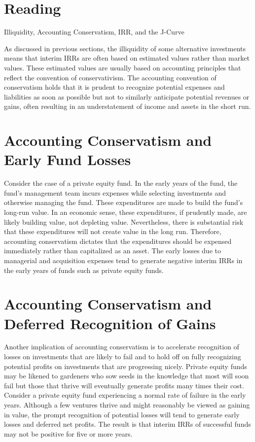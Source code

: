 \documentclass[11pt]{article}
\begin{document}
\section*{Reading}
Illiquidity, Accounting Conservatism, IRR, and the J-Curve

As discussed in previous sections, the illiquidity of some alternative investments means that interim IRRs are often based on estimated values rather than market values. These estimated values are usually based on accounting principles that reflect the convention of conservativism. The accounting convention of conservatism holds that it is prudent to recognize potential expenses and liabilities as soon as possible but not to similarly anticipate potential revenues or gains, often resulting in an understatement of income and assets in the short run.

\section*{Accounting Conservatism and Early Fund Losses}
Consider the case of a private equity fund. In the early years of the fund, the fund's management team incurs expenses while selecting investments and otherwise managing the fund. These expenditures are made to build the fund's long-run value. In an economic sense, these expenditures, if prudently made, are likely building value, not depleting value. Nevertheless, there is substantial risk that these expenditures will not create value in the long run. Therefore, accounting conservatism dictates that the expenditures should be expensed immediately rather than capitalized as an asset. The early losses due to managerial and acquisition expenses tend to generate negative interim IRRs in the early years of funds such as private equity funds.

\section*{Accounting Conservatism and Deferred Recognition of Gains}
Another implication of accounting conservatism is to accelerate recognition of losses on investments that are likely to fail and to hold off on fully recognizing potential profits on investments that are progressing nicely. Private equity funds may be likened to gardeners who sow seeds in the knowledge that most will soon fail but those that thrive will eventually generate profits many times their cost. Consider a private equity fund experiencing a normal rate of failure in the early years. Although a few ventures thrive and might reasonably be viewed as gaining in value, the prompt recognition of potential losses will tend to generate early losses and deferred net profits. The result is that interim IRRs of successful funds may not be positive for five or more years.
\end{document}
